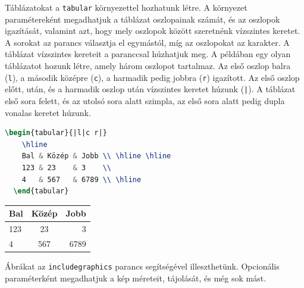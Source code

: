 Táblázatokat a \texttt{tabular} környezettel hozhatunk létre. A környezet
paramétereként megadhatjuk a táblázat oszlopainak számát, és az oszlopok
igazítását, valamint azt, hogy mely oszlopok között szeretnénk vízszintes
keretet. A sorokat az
\inlinecode{\textbackslash\textbackslash}
parancs választja el egymástól, míg az oszlopokat az
\inlinecode{\&}
karakter. A táblázat vízszintes kereteit a
paranccsal húzhatjuk meg. A példában egy olyan táblázatot hozunk létre, amely
három oszlopot tartalmaz. Az első oszlop balra (\texttt{l}), a második középre
(\texttt{c}), a harmadik pedig jobbra (\texttt{r}) igazított. Az első oszlop
előtt, után, és a harmadik oszlop után vízszintes keretet húzunk (\texttt{|}).
A táblázat első sora felett, és az utolsó sora alatt szimpla, az első sora alatt
pedig dupla vonalas keretet húzunk.

\begin{minipage}[t]{.5\textwidth}
	\begin{lstlisting}[language=tex,caption={Táblázatok létrehozása}]
  \begin{tabular}{|l|c r|}
    \hline
    Bal & Közép & Jobb \\ \hline \hline
    123 & 23    & 3    \\
    4   & 567   & 6789 \\ \hline
  \end{tabular}
\end{lstlisting}
\end{minipage}\hfill%
\begin{minipage}[t]{.45\textwidth}
	\vspace{10pt}
	\begin{center}
		\begin{tabular}{|l|c r|}
			\hline
			Bal & Közép & Jobb \\ \hline \hline
			123 & 23    & 3    \\
			4   & 567   & 6789 \\ \hline
		\end{tabular}
	\end{center}
\end{minipage}

Ábrákat az \texttt{includegraphics} parancs segítségével illeszthetünk.
Opcionális paraméterként megadhatjuk a kép méreteit, tájolását, és még sok
mást.

